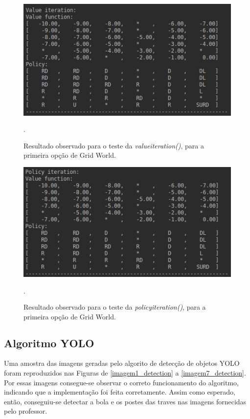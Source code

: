 \documentclass[conference]{IEEEtran}
\begin{document}
\begin{figure}[htbp]
\centering
\centerline{\includegraphics[scale=0.5]{imagens/grid1/value_iteration.png}}
\caption{Resultado observado para o teste da \textit{value\underline{\space}iteration()}, para a primeira opção de Grid World.}.
\label{grid1/value_iteration}
\end{figure} 

\begin{figure}[htbp]
\centering
\centerline{\includegraphics[scale=0.5]{imagens/grid1/policy_iteration.png}}
\caption{Resultado observado para o teste da \textit{policy\underline{\space}iteration()}, para a primeira opção de Grid World.}.
\label{grid1/policy_iteration}
\end{figure}

\subsection{Algoritmo YOLO}
Uma amostra das imagens geradas pelo algorito de detecção de objetos YOLO foram reproduzidos nas Figuras de \ref{imagem1_detection} a \ref{imagem7_detection}. Por essas imagens consegue-se observar o correto funcionamento do algoritmo, indicando que a implementação foi feita corretamente. Assim como esperado, então, conseguiu-se detectar a bola e os postes das traves nas imagens fornecidas pelo professor.
\end{document}
